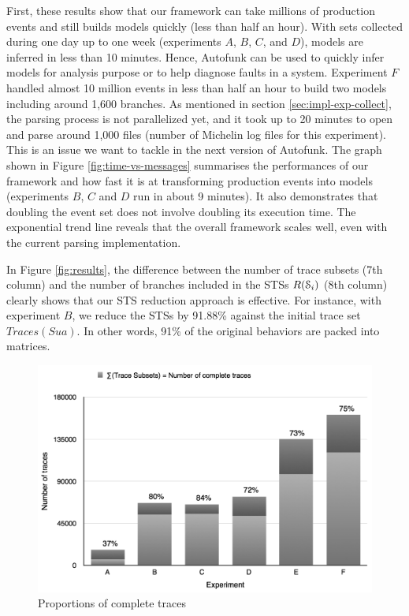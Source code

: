 First, these results show that our framework can take millions
of production events and still builds models quickly (less than
half an hour). With sets collected during one day up to one
week (experiments $A$, $B$, $C$, and $D$), models are inferred in
less than 10 minutes. Hence, Autofunk can be used to
quickly infer models for analysis purpose or to help diagnose
faults in a system. Experiment $F$ handled almost 10 million
events in less
than half an hour to build two models including around 1,600
branches. As mentioned in section \ref{sec:impl-exp-collect},
the parsing process is not parallelized yet, and it took up to 20
minutes to open and parse around 1,000 files (number of Michelin
log files for this experiment). This is an issue we want to
tackle in the next version of Autofunk. The graph shown
in Figure \ref{fig:time-vs-messages} summarises the performances
of our framework and how fast it is at transforming production
events into models (experiments $B$, $C$ and $D$ run in about 9
minutes). It also demonstrates that doubling the event
set does not involve doubling its execution time. The exponential
trend line reveals that the overall framework scales well, even
with the current parsing implementation.

In Figure \ref{fig:results}, the difference between the number of
trace subsets (7th column) and the number of branches included in
the STSs $R(\EuScript{S}_i)$ (8th column) clearly shows that our
STS reduction approach is effective. For instance, with
experiment $B$, we reduce the STSs by 91.88\% against the initial
trace set $Traces(Sua)$. In other words, 91\% of the original
behaviors are packed into matrices.

\begin{figure}[ht]
  \includegraphics[width=0.9\linewidth]{figures/proportions.png}

  \caption{Proportions of complete traces}
  \label{fig:proportions}
\end{figure}

